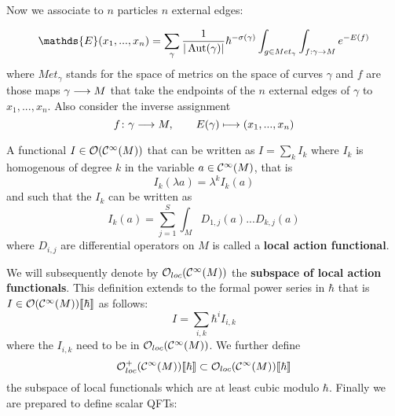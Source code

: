 Now we associate to $n$ particles $n$ external edges:

\begin{equation} \mathds{E}(x_1, ..., x_n) = \sum_\gamma \frac{1}{|\Aut(\gamma)|} \hbar^{-\sigma(\gamma)} \int_{g \in Met_\gamma} \int_{f: \gamma \ra M} e^{-E(f)}\end{equation}
where $Met_\gamma$ stands for the space of metrics on the space of curves $\gamma$ and $f$ are those maps $\gamma \longrightarrow M$ that take the endpoints of the $n$ external edges of $\gamma$ to $x_1,...,x_n$. Also consider the inverse assignment
\begin{equation} f \colon \gamma \longrightarrow M, \quad \quad E(\gamma) \longmapsto (x_1,...,x_n)\end{equation}

\begin{definition}
  A functional $I \in \mathcal{O}(\mathcal{C}^{\infty}(M))$ that can be written as $I = \sum_k I_k$ where $I_k$ is homogenous of degree $k$ in the variable $a \in \mathcal{C}^{\infty}(M)$, that is
  \begin{equation}I_k(\lambda a) = \lambda^k I_k(a)\end{equation}
  and such that the $I_k$ can be written as
  \begin{equation}I_k (a) = \sum_{j=1}^{S} \int_M D_{1,j} (a) ... D_{k,j} (a)\end{equation}
  where $D_{i,j}$ are differential operators on $M$ is called a \textbf{local action functional}.
\end{definition}

We will subsequently denote by $\mathcal{O}_{loc}(\mathcal{C}^{\infty}(M))$ the \textbf{subspace of local action functionals}. This definition extends to the formal power series in $\hbar$ that is $I \in \mathcal{O}(\mathcal{C}^{\infty}(M))\llbracket \hbar \rrbracket$ as follows:
\begin{equation} I = \sum_{i,k} \hbar^i I_{i,k}\end{equation}
where the $I_{i,k}$ need to be in $\mathcal{O}_{loc}(\mathcal{C}^{\infty}(M))$. We further define
\begin{equation} \mathcal{O}^+_{loc}(\mathcal{C}^{\infty}(M))\llbracket \hbar \rrbracket \subset \mathcal{O}_{loc}(\mathcal{C}^{\infty}(M))\llbracket \hbar \rrbracket\end{equation}
the subspace of local functionals which are at least cubic modulo $\hbar$. Finally we are prepared to define scalar QFTs:

